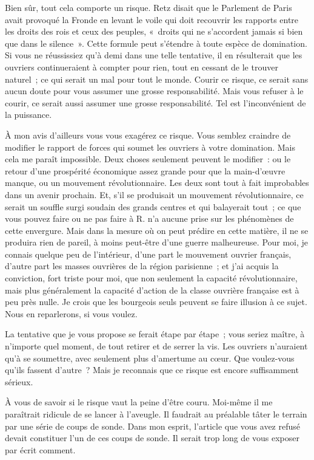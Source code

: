 \documentclass[french,twoside]{book} %
\begin{document}
Bien sûr, tout cela comporte un risque. Retz disait que le Parlement de Paris avait provoqué la Fronde en levant le voile qui doit recouvrir les rapports entre les droits des rois et ceux des peuples, « droits qui ne s'accordent jamais si bien que dans le silence ». Cette formule peut s'étendre à toute espèce de domination. Si vous ne réussissiez qu'à demi dans une telle tentative, il en résulterait que les ouvriers continueraient à compter pour rien, tout en cessant de le trouver naturel ; ce qui serait un mal pour tout le monde. Courir ce risque, ce serait sans aucun doute pour vous assumer une grosse responsabilité. Mais vous refuser à le courir, ce serait aussi assumer une grosse responsabilité. Tel est l'inconvénient de la puissance.\par
À mon avis d'ailleurs vous vous exagérez ce risque. Vous semblez craindre de modifier le rapport de forces qui soumet les ouvriers à votre domination. Mais cela me paraît impossible. Deux choses seulement peuvent le modifier : ou le retour d'une prospérité économique assez grande pour que la main-d'œuvre manque, ou un mouvement révolutionnaire. Les deux sont tout à fait improbables dans un avenir prochain. Et, s'il se produisait un mouvement révolutionnaire, ce serait un souffle surgi soudain des grands centres et qui balayerait tout ; ce que vous pouvez faire ou ne pas faire à R. n'a aucune prise sur les phénomènes de cette envergure. Mais dans la mesure où on peut prédire en cette matière, il ne se produira rien de pareil, à moins peut-être d'une guerre malheureuse. Pour moi, je connais quelque peu de l'intérieur, d'une part le mouvement ouvrier français, d'autre part les masses ouvrières de la région parisienne ; et j'ai acquis la conviction, fort triste pour moi, que non seulement la capacité révolutionnaire, mais plus généralement la capacité d'action de la classe ouvrière française est à peu près nulle. Je crois que les bourgeois seuls peuvent se faire illusion à ce sujet. Nous en reparlerons, si vous voulez.\par
La tentative que je vous propose se ferait étape par étape ; vous seriez maître, à n'importe quel moment, de tout retirer et de serrer la vis. Les ouvriers n'auraient qu'à se soumettre, avec seulement plus d'amertume au cœur. Que voulez-vous qu'ils fassent d'autre ? Mais je reconnais que ce risque est encore suffisamment sérieux.\par
À vous de savoir si le risque vaut la peine d'être couru. Moi-même il me paraîtrait ridicule de se lancer à l'aveugle. Il faudrait au préalable tâter le terrain par une série de coups de sonde. Dans mon esprit, l'article que vous avez refusé devait constituer l'un de ces coups de sonde. Il serait trop long de vous exposer par écrit comment.\par
\end{document}
